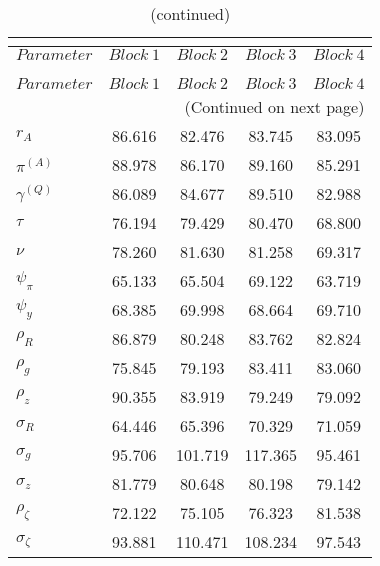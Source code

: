  
\begin{center}
\begin{longtable}{lcccc} 
\caption{MCMC Inefficiency factors per block}\\
 \label{Table:MCMC_inefficiency_factors}\\
\toprule 
$Parameter         $	 & 	 $     Block~1$	 & 	 $     Block~2$	 & 	 $     Block~3$	 & 	 $     Block~4$\\
\midrule \endfirsthead 
\caption{(continued)}\\
 \toprule \\ 
$Parameter         $	 & 	 $     Block~1$	 & 	 $     Block~2$	 & 	 $     Block~3$	 & 	 $     Block~4$\\
\midrule \endhead 
\midrule \multicolumn{5}{r}{(Continued on next page)} \\ \bottomrule \endfoot 
\bottomrule \endlastfoot 
$ {r_{A}}          $	 & 	      86.616	 & 	      82.476	 & 	      83.745	 & 	      83.095 \\ 
$ {\pi^{(A)}}      $	 & 	      88.978	 & 	      86.170	 & 	      89.160	 & 	      85.291 \\ 
$ {\gamma^{(Q)}}   $	 & 	      86.089	 & 	      84.677	 & 	      89.510	 & 	      82.988 \\ 
$ {\tau}           $	 & 	      76.194	 & 	      79.429	 & 	      80.470	 & 	      68.800 \\ 
$ {\nu}            $	 & 	      78.260	 & 	      81.630	 & 	      81.258	 & 	      69.317 \\ 
$ {\psi_\pi}       $	 & 	      65.133	 & 	      65.504	 & 	      69.122	 & 	      63.719 \\ 
$ {\psi_y}         $	 & 	      68.385	 & 	      69.998	 & 	      68.664	 & 	      69.710 \\ 
$ {\rho_R}         $	 & 	      86.879	 & 	      80.248	 & 	      83.762	 & 	      82.824 \\ 
$ {\rho_{g}}       $	 & 	      75.845	 & 	      79.193	 & 	      83.411	 & 	      83.060 \\ 
$ {\rho_z}         $	 & 	      90.355	 & 	      83.919	 & 	      79.249	 & 	      79.092 \\ 
$ {\sigma_R}       $	 & 	      64.446	 & 	      65.396	 & 	      70.329	 & 	      71.059 \\ 
$ {\sigma_{g}}     $	 & 	      95.706	 & 	     101.719	 & 	     117.365	 & 	      95.461 \\ 
$ {\sigma_z}       $	 & 	      81.779	 & 	      80.648	 & 	      80.198	 & 	      79.142 \\ 
$ {\rho_\zeta}     $	 & 	      72.122	 & 	      75.105	 & 	      76.323	 & 	      81.538 \\ 
$ {\sigma_\zeta}   $	 & 	      93.881	 & 	     110.471	 & 	     108.234	 & 	      97.543 \\ 
\end{longtable}
 \end{center}
